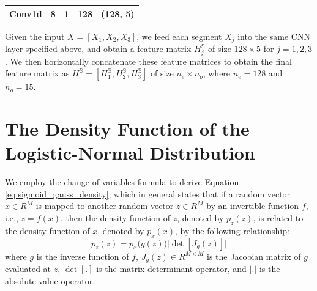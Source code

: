 \documentclass[mnsc]{informs3b} %
\begin{document}
\begin{appendices}
\begin{table}[h]
\begin{threeparttable}
\begin{tabular}{L{50pt}C{40pt}C{30pt}C{40pt}C{60pt}}
 Conv1d & 8 & 1 & 128 & (128, 5) \\
 \bottomrule
\end{tabular}
\end{threeparttable}
\end{table}

Given the input $X=[X_1,X_2,X_3]$, we feed each segment $X_j$ into the same CNN layer specified above, and obtain a feature matrix $H_j^\mathbb{S}$ of size $128 \times 5$ for $j=1,2,3$. We then horizontally concatenate these feature matrices to obtain the final feature matrix as $H^\mathbb{S}=[H_1^\mathbb{S}, H_2^\mathbb{S}, H_3^\mathbb{S}]$ of size $n_e \times n_o$, where $n_e=128$ and $n_o=15$.

\clearpage

\section{The Density Function of the Logistic-Normal Distribution}\label{apd:der_logistic_normal}

We employ the change of variables formula  to derive Equation \ref{eq:sigmoid_gauss_density}, which in general states that if a random vector $x \in R^{M}$ is mapped to another random vector $z \in R^{M}$ by an invertible
function $f$, i.e., $z=f(x)$, then the density function of $z$, denoted by $p_z(z)$, is related to the density function of $x$, denoted by $p_x(x)$, by the following relationship:
\begin{equation}
\label{eq:change_of_var}
p_z(z) = p_x\big( g(z) \big) \big| \det[J_g(z)] \big|
\end{equation}
where $g$ is the inverse function of $f$, $J_{g}(z) \in R^{M \times M}$ is the Jacobian matrix of $g$ evaluated at $z$, $\det [.]$ is the matrix determinant operator, and $|.|$ is the absolute value operator. 


\end{appendices}
\end{document}
